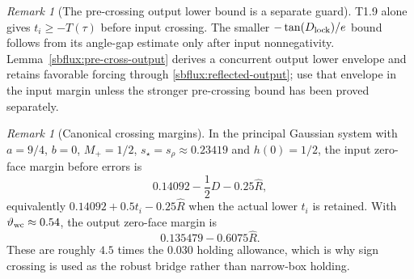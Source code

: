 \documentclass{article} %
\theoremstyle{plain}
\theoremstyle{definition}
\theoremstyle{remark}
\newtheorem{remark}[theorem]{Remark}
\begin{document}
\begin{remark}[The pre-crossing output lower bound is a separate guard]
T1.9 alone gives $t_i\ge-T(\tau)$ before input crossing. The smaller
$-\tan(D_{\rm lock})/e$ bound follows from its angle-gap estimate only
after input nonnegativity. Lemma~\ref{sbflux:pre-cross-output} derives a
concurrent output lower envelope and retains favorable forcing through
\eqref{sbflux:reflected-output}; use that envelope in the input margin
unless the stronger pre-crossing bound has been proved separately.
\end{remark}

\begin{remark}[Canonical crossing margins]
\label{sbemp:canonical-crossing}
In the principal Gaussian system with
$a=9/4$, $b=0$, $M_+=1/2$, $s_\star=s_\rho\approx0.23419$ and
$h(0)=1/2$, the input zero-face margin before errors is
\[
 \boxed{0.14092-\frac12D-0.25\widehat R,}
\]
equivalently $0.14092+0.5t_i-0.25\widehat R$ when the actual lower
$t_i$ is retained.  With $\vartheta_{\rm wc}\approx0.54$, the output
zero-face margin is
\[
 \boxed{0.135479-0.6075\widehat R.}
\]
These are roughly $4.5$ times the $0.030$ holding allowance, which is why
sign crossing is used as the robust bridge rather than narrow-box holding.
\end{remark}
\end{document}
